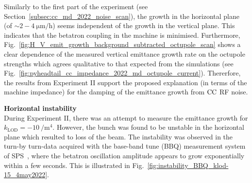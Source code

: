Similarly to the first part of the experiment (see Section~\ref{subsec:cc_md_2022_noise_scan}), the growth in the horizontal plane (of $\sim 2-4 \ \mathrm{\mu m/h}$) seems independent of the growth in the vertical plane. This indicates that the betatron coupling in the machine is minimised. Furthermore, Fig.~\ref{fig:H_V_emit_growth_background_subtracted_octupole_scan} shows a clear dependence of the measured vertical emittance growth rate on the octupole strengths which agrees qualitative to that expected from the simulations (see Fig.~\ref{fig:pyheadtail_cc_impedance_2022_md_octupole_current}). Thererfore, the results from Experiment II support the proposed explanation (in terms of the machine impedance) for the damping of the emittance growth from ${\mathrm{CC}}$ RF noise.

\textbf{Horizontal instability}\\
During Experiment II, there was an attempt to measure the emittance growth for $k_\mathrm{LOD}=-10 \ \mathrm{/m^4}$. However, the bunch was found to be unstable in the horizontal plane which resulted to loss of the beam. The instability was observed in the turn-by turn-data acquired with the base-band tune (BBQ) measurement system of SPS~\cite{Boccardi:1055568}, where the betatron oscillation amplitude appears to grow exponentially within a few seconds. This is illustrated in Fig.~\ref{fig:instability_BBQ_klod-15_4may2022}.






